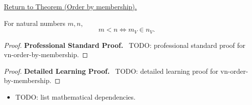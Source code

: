 \newpage
{}
\label{prf:vn-order-by-membership}

\begin{remark*}[Return]
\hyperref[prop:vn-order-by-membership]{Return to Theorem (Order by membership).}
\end{remark*}

\begin{theorem*}
For natural numbers $m,n$,
\[
m<n \iff m_V \in n_V.
\]
\end{theorem*}

\begin{proof}
\textbf{Professional Standard Proof.}~
TODO: professional standard proof for vn-order-by-membership.
\end{proof}

\begin{proof}
\textbf{Detailed Learning Proof.}~
TODO: detailed learning proof for vn-order-by-membership.
\end{proof}

\begin{remark*}
\end{remark*}

\begin{dependencies}
\begin{itemize}
  \item TODO: list mathematical dependencies.
\end{itemize}
\end{dependencies}

\clearpage

